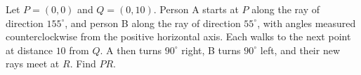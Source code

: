 Let $P=(0,0)$ and $Q=(0,10)$. Person A starts at $P$ along the ray of direction $155^\circ$, and person B along the ray of direction $55^\circ$, with angles measured counterclockwise from the positive horizontal axis. Each walks to the next point at distance $10$ from $Q$. A then turns $90^\circ$ right, B turns $90^\circ$ left, and their new rays meet at $R$. Find $PR$.
